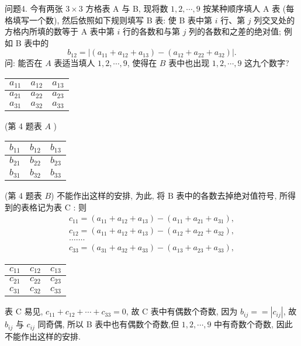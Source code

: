 问题4. 今有两张 $3 \times 3$ 方格表 A 与 B, 现将数 $1,2, \cdots, 9$ 按某种顺序填人 A 表 (每格填写一个数), 然后依照如下规则填写 B 表: 使 B 表中第 $i$ 行、第 $j$ 列交叉处的方格内所填的数等于 $\mathrm{A}$ 表中第 $i$ 行的各数和与第 $j$ 列的各数和之差的绝对值; 例如 B 表中的
$$
b_{12}=\left|\left(a_{11}+a_{12}+a_{13}\right)-\left(a_{12}+a_{22}+a_{32}\right)\right| .
$$
问: 能否在 $A$ 表适当填人 $1,2, \cdots, 9$, 使得在 $B$ 表中也出现 $1,2, \cdots, 9$
这九个数字?
\begin{tabular}{|l|l|l|}
\hline$a_{11}$ & $a_{12}$ & $a_{13}$ \\
\hline$a_{21}$ & $a_{22}$ & $a_{23}$ \\
\hline$a_{31}$ & $a_{32}$ & $a_{33}$ \\
\hline
\end{tabular}
(第 4 题表 $A$ )
\begin{tabular}{|l|l|l|}
\hline$b_{11}$ & $b_{12}$ & $b_{13}$ \\
\hline$b_{21}$ & $b_{22}$ & $b_{23}$ \\
\hline$b_{31}$ & $b_{32}$ & $b_{33}$ \\
\hline
\end{tabular}
(第 4 题表 $B$)
不能作出这样的安排, 为此, 将 $\mathrm{B}$ 表中的各数去掉绝对值符号, 所得到的表格记为表 $\mathrm{C}$ :
则
$$
\begin{gathered}
c_{11}=\left(a_{11}+a_{12}+a_{13}\right)-\left(a_{11}+a_{21}+a_{31}\right), \\
c_{12}=\left(a_{11}+a_{12}+a_{13}\right)-\left(a_{12}+a_{22}+a_{32}\right), \\
\ldots \ldots . \\
c_{33}=\left(a_{31}+a_{32}+a_{33}\right)-\left(a_{13}+a_{23}+a_{33}\right),
\end{gathered}
$$
\begin{tabular}{|l|l|l|}
\hline$c_{11}$ & $c_{12}$ & $c_{13}$ \\
\hline$c_{21}$ & $c_{22}$ & $c_{23}$ \\
\hline$c_{31}$ & $c_{32}$ & $c_{33}$ \\
\hline
\end{tabular}
表 C
易见, $c_{11}+c_{12}+\cdots+c_{33}=0$, 故 C 表中有偶数个奇数, 因为 $b_{i j}==\left|c_{i j}\right|$, 故 $b_{i j}$ 与 $c_{i j}$ 同奇偶, 所以 B 表中也有偶数个奇数,但 $1,2, \cdots, 9$ 中有奇数个奇数, 因此不能作出这样的安排.



